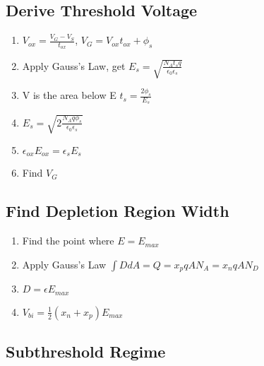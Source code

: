 \documentclass{article}
\begin{document}
   \subsection{Derive Threshold Voltage}
   \begin{enumerate}
     \item $V_{ox} = \frac{V_G - V_{S}}{t_{ox}}$, $V_G = V_{ox}t_{ox} + \phi_s$
     \item Apply Gauss's Law, get $E_s =\sqrt{ \frac{N_At_sq}{\epsilon_0\epsilon_s}}$ 
     \item V is the area below E $t_s = \frac{2\phi_s}{E_s}$
     \item $E_s =\sqrt{ 2\frac{N_Aq\phi_s}{\epsilon_0\epsilon_s}}$ 
     \item $\epsilon_{ox}E_{ox} = \epsilon_{s}E_s$
     \item Find $V_G$
   \end{enumerate}
   
   \subsection{Find Depletion Region Width}
   \begin{enumerate}
     \item Find the point where $E = E_{max}$
     \item Apply Gauss's Law $\int DdA = Q = x_pqAN_A = x_nqAN_D$
     \item $D = \epsilon E_{max}$
     \item $V_{bi} = \frac{1}{2}(x_n + x_p)E_{max}$
   \end{enumerate}
   
   \subsection{Subthreshold Regime}
   
   
\end{document}
